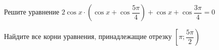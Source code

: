 \begin{ex}
	\begin{condition}
		\begin{enumcols}[label=\asbuk*)]
			\item Решите уравнение \( 2\cos x\cdot  \left(\cos x +\cos {\dfrac{5\pi}{4}}\right) + \cos x + \cos{\dfrac{3\pi}{4}} = 0 \)
			\item Найдите все корни уравнения, принадлежащие отрезку \( \left[\pi;\dfrac{5\pi}{2}\right) \)
		\end{enumcols}
	\end{condition}
\end{ex}